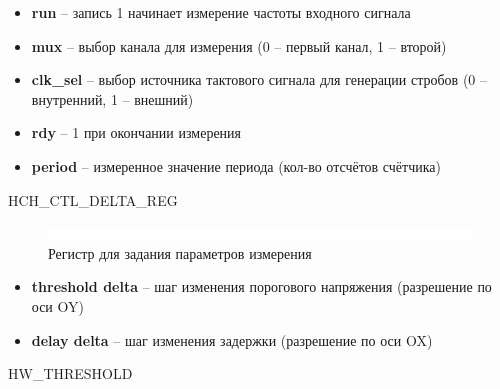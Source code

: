 \noindent
\begin{itemize}[label={}]
	\item \textbf{run} -- запись 1 начинает измерение частоты входного сигнала
	\item \textbf{mux} -- выбор канала для измерения (0 -- первый канал, 1 -- второй)
	\item \textbf{clk\_sel} -- выбор источника тактового сигнала для генерации стробов (0 -- внутренний, 1 -- внешний)
	\item \textbf{rdy} -- 1 при окончании измерения
	\item \textbf{period} -- измеренное значение периода (кол-во отсчётов счётчика)\\
\end{itemize}

\begin{register}{H}{CH\_CTL\_DELTA\_REG}{}%
\label{example}%
%
%
%
 \regnewline%

\end{register}


\begin{figure}[ht!] 
	\center
	\includegraphics  {my_folder/images//blank}
	\caption{Регистр для задания параметров измерения} 
	\label{fig:delta-reg}  
\end{figure}
\FloatBarrier

\noindent
\begin{itemize}[label={}]
	\item \textbf{threshold delta} -- шаг изменения порогового напряжения (разрешение по оси OY)
	\item \textbf{delay delta} -- шаг изменения задержки (разрешение по оси OX)\\
\end{itemize}


\begin{register}{H}{W\_THRESHOLD}{}%
\label{example}%
%
%
%
 \regnewline%

%
%
\regnewline%
\end{register}

